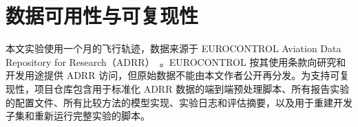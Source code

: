 \section*{数据可用性与可复现性}

本文实验使用一个月的飞行轨迹，数据来源于 EUROCONTROL Aviation Data Repository for Research（ADRR）~\cite{eurocontrol_adrr_2025}。EUROCONTROL 按其使用条款向研究和开发用途提供 ADRR 访问，但原始数据不能由本文作者公开再分发。为支持可复现性，项目仓库包含用于标准化 ADRR 数据的端到端预处理脚本、所有报告实验的配置文件、所有比较方法的模型实现、实验日志和评估摘要，以及用于重建开发子集和重新运行完整实验的脚本。
